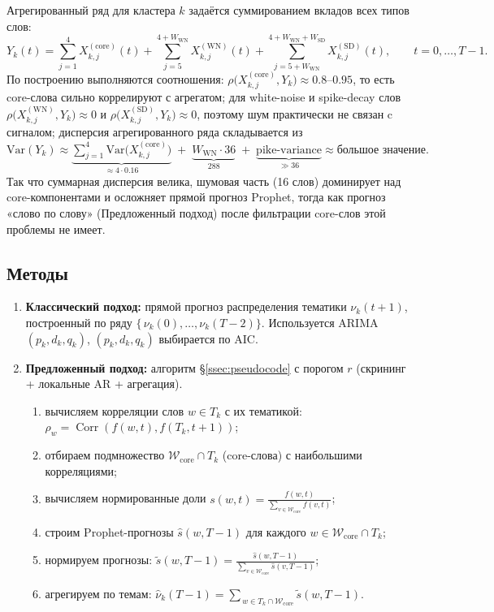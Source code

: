 \documentclass[14pt,a4paper]{article}
\begin{document}
Агрегированный ряд для кластера $k$ задаётся суммированием вкладов всех типов слов: 
\[
Y_k(t)=\sum_{j=1}^{4}X_{k,j}^{(\mathrm{core})}(t)+\sum_{j=5}^{4+W_{\mathrm{WN}}}X_{k,j}^{(\mathrm{WN})}(t)+\sum_{j=5+W_{\mathrm{WN}}}^{4+W_{\mathrm{WN}}+W_{\mathrm{SD}}}X_{k,j}^{(\mathrm{SD})}(t),\qquad t=0,\dots,T-1.
\]
По построению выполняются соотношения: $\rho\bigl(X_{k,j}^{(\mathrm{core})},Y_k\bigr)\approx0.8\text{–}0.95$, то есть core-слова сильно коррелируют с агрегатом; для white-noise и spike-decay слов $\rho\bigl(X_{k,j}^{(\mathrm{WN})},Y_k\bigr)\approx0$ и $\rho\bigl(X_{k,j}^{(\mathrm{SD})},Y_k\bigr)\approx0$, поэтому шум практически не связан c сигналом; дисперсия агрегированного ряда складывается из 
\(\mathrm{Var}(Y_k)\approx \underbrace{\sum_{j=1}^{4} \mathrm{Var}\bigl(X_{k,j}^{(\mathrm{core})}\bigr)}_{\approx 4\cdot0.16}\;+\;\underbrace{W_{\mathrm{WN}}\cdot36}_{288} \;+\;\underbrace{\text{pike‐variance}}_{\gg 36}\approx\text{большое значение}.\)
Так что суммарная дисперсия велика, шумовая часть (16 слов) доминирует над core-компонентами и осложняет прямой прогноз Prophet, тогда как прогноз «слово по слову» (Предложенный подход) после фильтрации core-слов этой проблемы не имеет. 














\subsection{Методы}

\begin{enumerate}
  \item \textbf{Классический подход:} прямой прогноз распределения тематики \(\nu_k(t+1)\), построенный по ряду 
  \(\{\,\nu_k(0),\dots,\nu_k(T-2)\}\). Используется ARIMA$(p_k,d_k,q_k)$, $(p_k,d_k,q_k)$ выбирается по AIC.
  \item \textbf{Предложенный подход:} алгоритм \S\ref{ssec:pseudocode} с порогом $r$
      (скрининг + локальные AR + агрегация).
    \begin{enumerate}
      \item вычисляем корреляции слов \(w\in T_k\) с их тематикой: 
        \(\rho_w = \operatorname{Corr}(f(w,t),f(T_k,t+1))\);
      \item отбираем подмножество \(\mathcal{W}_{\mathrm{core}} \cap T_k\) (core-слова) с наибольшими корреляциями;
      \item вычисляем нормированные доли \(s(w,t)=\frac{f(w,t)}{\sum_{v\in\mathcal{W}_{\mathrm{core}}}f(v,t)}\);
      \item строим Prophet-прогнозы \(\widehat{s}(w,T-1)\) для каждого \(w\in\mathcal{W}_{\mathrm{core}} \cap T_k\);
      \item нормируем прогнозы: \(\widetilde{s}(w,T-1) = \frac{\widehat{s}(w,T-1)}{\sum_{v \in \mathcal{W}_{\mathrm{core}}} \widehat{s}(v,T-1)}\);
      \item агрегируем по темам: \(\widehat{\nu}_k(T-1) = \sum_{\,w\in T_k \cap \mathcal{W}_{\mathrm{core}}} \widetilde{s}(w,T-1).\)
    \end{enumerate}
\end{enumerate}
\end{document}
